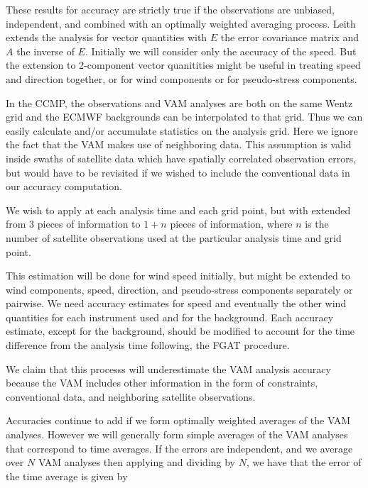 \documentclass[12pt,titlepage]{article}
\begin{document}
These results for accuracy are strictly true if the observations
are unbiased, independent, and combined with an optimally weighted
averaging process.
Leith extends the analysis for vector quantities with $E$ the error
covariance matrix and $A$ the inverse of $E$.
Initially we will consider only the accuracy of the speed.
But the extension to 2-component vector quanitities might be useful in
treating speed and direction together, or for wind components or for
pseudo-stress components.


In the CCMP, the observations and VAM analyses are both on the same
 Wentz grid and the ECMWF backgrounds can be interpolated
to that grid.
Thus we can easily calculate and/or accumulate statistics on the
analysis grid.
Here we ignore the fact that the VAM makes use of neighboring data.
This assumption is valid inside swaths of satellite data which have
spatially correlated observation errors, but would have to be
revisited if we wished to include the conventional data in our
accuracy computation.


We wish to apply  at each analysis time and each grid point,
but with  extended from 3 pieces of information to $1 + n$
pieces of information, where $n$ is the number of satellite
observations used at the particular analysis time and grid point.

This estimation will be done for wind speed initially, but might be
extended to wind components, speed,
direction, and pseudo-stress components separately or pairwise.
We need accuracy estimates for speed and eventually the other wind
quantities for each instrument used and for the background.
Each accuracy estimate, except for the background, should be modified
to account for the time difference from the analysis time following,
the FGAT procedure.

We claim that this processs will underestimate the VAM analysis
accuracy because the VAM includes other information in the form of
constraints, conventional data, and neighboring satellite observations.


Accuracies continue to add if we form optimally weighted averages of
the VAM analyses.
However we will generally form simple averages of the VAM analyses
that correspond to time averages.
If the errors are independent, and we average over $N$ VAM analyses
then applying  and dividing by $N$, we have that the error
of the time average is given by
\end{document}
